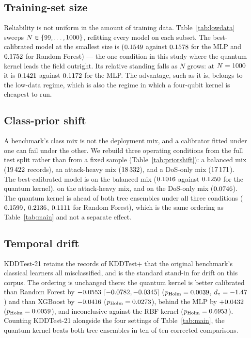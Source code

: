 \documentclass[journal]{IEEEtran}
\begin{document}


\subsection{Training-set size}
Reliability is not uniform in the amount of training data.
Table~\ref{tab:lowdata} sweeps $N\in\{99,\ldots,1000\}$, refitting
every model on each subset. The best-calibrated model at the smallest size
is \pldWinnerMin{} ($0.1549$ against $0.1578$ for the MLP and
$0.1752$ for Random Forest) --- the one condition in this study where the
quantum kernel leads the field outright. Its relative standing falls as $N$
grows: at $N=1000$ it is $0.1421$ against $0.1172$ for the MLP.
The advantage, such as it is, belongs to the low-data regime, which is also
the regime in which a four-qubit kernel is cheapest to run.

\subsection{Class-prior shift}
A benchmark's class mix is not the deployment mix, and a calibrator fitted
under one can fail under the other. We rebuild three operating conditions
from the full test split rather than from a fixed sample
(Table~\ref{tab:priorshift}): a balanced mix ($19\,422$ records), an
attack-heavy mix ($18\,332$), and a DoS-only mix ($17\,171$). The
best-calibrated model is \ppsBalWinner{} on the balanced mix ($0.1016$
against $0.1250$ for the quantum kernel), \ppsAttWinner{} on the
attack-heavy mix, and \ppsDosWinner{} on the DoS-only mix ($0.0746$).
The quantum kernel is ahead of both tree ensembles under all three
conditions ($0.1599$, $0.2136$, $0.1111$ for Random Forest), which
is the same ordering as Table~\ref{tab:main} and not a separate effect.

\subsection{Temporal drift}
KDDTest-21 retains the records of KDDTest+ that the original benchmark's
classical learners all misclassified, and is the standard stand-in for
drift on this corpus. The ordering is unchanged there: the quantum kernel is
better calibrated than Random Forest by $-0.0553$
$[-0.0782,-0.0345]$ ($p_{\text{Holm}}=0.0039$,
$d_z=-1.47$) and than XGBoost by $-0.0416$
($p_{\text{Holm}}=0.0273$), behind the MLP by $+0.0432$
($p_{\text{Holm}}=0.0059$), and inconclusive against the RBF kernel
($p_{\text{Holm}}=0.6953$). Counting KDDTest-21 alongside the four
settings of Table~\ref{tab:main}, the quantum kernel beats both tree
ensembles in ten of ten corrected comparisons.
\end{document}
